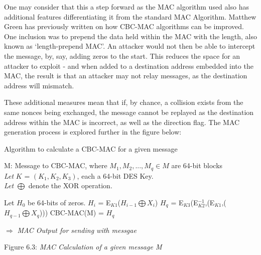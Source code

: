 \documentclass[twoside,11pt,a4paper]{article}
\begin{document}
One may consider that this a step forward as the MAC algorithm used also has additional features differentiating it from the standard MAC Algorithm. Matthew Green \citep{Green13a} has previously written on how CBC-MAC algorithms can be improved. One inclusion was to prepend the data held within the MAC with the length, also known as `length-prepend MAC'. An attacker would not then be able to intercept the message, by, say, adding zeros to the start. This reduces the space for an attacker to exploit - and when added to a destination address embedded into the MAC, the result is that an attacker may not relay messages, as the destination address will mismatch.

These additional measures mean that if, by chance, a collision exists from the same nonces being exchanged, the message cannot be replayed as the destination address within the MAC is incorrect, as well as the direction flag. The MAC generation process is explored further in the figure below:

\begin{algorithm}[H]
\renewcommand{\thealgorithm}{}
\caption{Algorithm to calculate a CBC-MAC for a given message}
M: Message to CBC-MAC, where $M_1,M_2,...,M_q \in M$ are 64-bit blocks\\
\textit{Let} $K$ = $(K_1,K_2,K_3)$, each a 64-bit DES Key.\\
\textit{Let} $\bigoplus$ denote the XOR operation.

\label{MAC Algorithm}
\begin{algorithmic}[1]
\STATE Let $H_0$ be 64-bits of zeros.
	\STATE $H_i$ = E$_{K1}$($H_{i-1} \bigoplus X_i$)
\ENDFOR 
\STATE $H_q$ =  E$_{K3}$(E$^{-1}_{K2}$,(E$_{K1}$,($H_{q-1} \bigoplus X_q$)))
\STATE CBC-MAC(M) = $H_q$
\end{algorithmic}
$\Rightarrow$ \textit{MAC Output for sending with messgae}
\end{algorithm}
\begin{center}
\vspace{-0.5cm}
Figure 6.3: \textit{MAC Calculation of a given message M}
\end{center}
\end{document}
